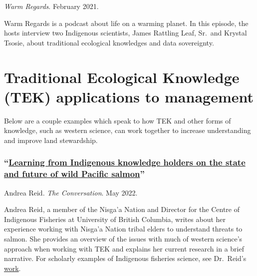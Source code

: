 \documentclass[
]{book}
\begin{document}
\emph{Warm Regards}. February 2021.

Warm Regards is a podcast about life on a warming planet. In this episode, the hosts interview two Indigenous scientists, James Rattling Leaf, Sr.~and Krystal Tsosie, about traditional ecological knowledges and data sovereignty.

\hypertarget{traditional-ecological-knowledge-tek-applications-to-management}{%
\section{Traditional Ecological Knowledge (TEK) applications to management}\label{traditional-ecological-knowledge-tek-applications-to-management}}

Below are a couple examples which speak to how TEK and other forms of knowledge, such as western science, can work together to increase understanding and improve land stewardship.

\hypertarget{learning-from-indigenous-knowledge-holders-on-the-state-and-future-of-wild-pacific-salmon}{%
\subsubsection*{\texorpdfstring{``\href{https://theconversation.com/learning-from-indigenous-knowledge-holders-on-the-state-and-future-of-wild-pacific-salmon-182411}{Learning from Indigenous knowledge holders on the state and future of wild Pacific salmon}''}{``Learning from Indigenous knowledge holders on the state and future of wild Pacific salmon''}}\label{learning-from-indigenous-knowledge-holders-on-the-state-and-future-of-wild-pacific-salmon}}

Andrea Reid. \emph{The Conversation}. May 2022.

Andrea Reid, a member of the Nisga'a Nation and Director for the Centre of Indigenous Fisheries at University of British Columbia, writes about her experience working with Nisga'a Nation tribal elders to understand threats to salmon. She provides an overview of the issues with much of western science's approach when working with TEK and explains her current research in a brief narrative. For scholarly examples of Indigenous fisheries science, see Dr.~Reid's \href{https://scholar.google.com/citations?hl=en\&user=WWdYxJgAAAAJ}{work}.
\end{document}
